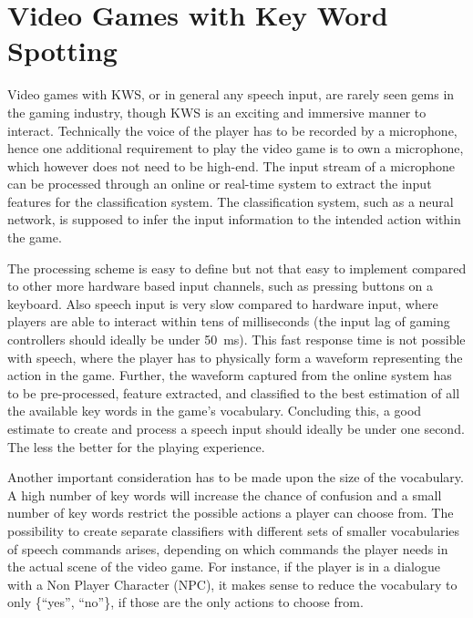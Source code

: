 
\section{Video Games with Key Word Spotting}\label{sec:intro_games}
Video games with KWS, or in general any speech input, are rarely seen gems in the gaming industry, though KWS is an exciting and immersive manner to interact.
Technically the voice of the player has to be recorded by a microphone, hence one additional requirement to play the video game is to own a microphone, which however does not need to be high-end.
The input stream of a microphone can be processed through an online or real-time system to extract the input features for the classification system.
The classification system, such as a neural network, is supposed to infer the input information to the intended action within the game.

The processing scheme is easy to define but not that easy to implement compared to other more hardware based input channels, such as pressing buttons on a keyboard.
Also speech input is very slow compared to hardware input, where players are able to interact within tens of milliseconds (the input lag of gaming controllers should ideally be under \SI{50}{\milli\second}).
This fast response time is not possible with speech, where the player has to physically form a waveform representing the action in the game.
Further, the waveform captured from the online system has to be pre-processed, feature extracted, and classified to the best estimation of all the available key words in the game's vocabulary.
Concluding this, a good estimate to create and process a speech input should ideally be under one second. 
The less the better for the playing experience.

Another important consideration has to be made upon the size of the vocabulary.
A high number of key words will increase the chance of confusion and a small number of key words restrict the possible actions a player can choose from.
The possibility to create separate classifiers with different sets of smaller vocabularies of speech commands arises, depending on which commands the player needs in the actual scene of the video game.
For instance, if the player is in a dialogue with a Non Player Character (NPC), it makes sense to reduce the vocabulary to only \{\enquote{yes}, \enquote{no}\}, if those are the only actions to choose from.

